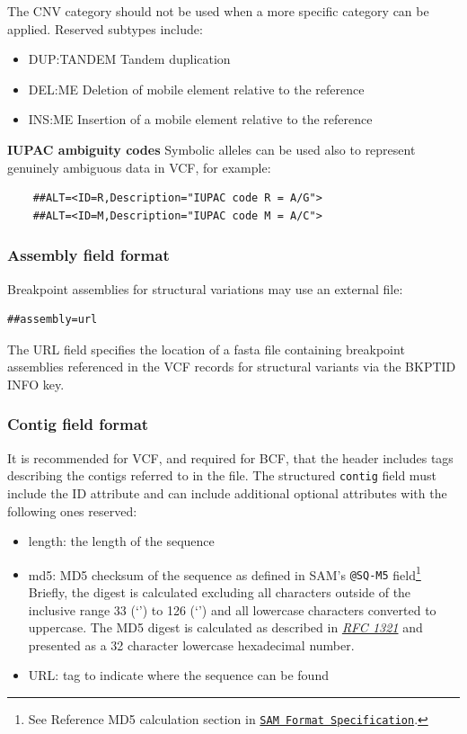 \documentclass[8pt]{article}
\begin{document}
The CNV category should not be used when a more specific category can be applied. Reserved subtypes include:
\begin{itemize}
  \item DUP:TANDEM Tandem duplication
  \item DEL:ME Deletion of mobile element relative to the reference
  \item INS:ME Insertion of a mobile element relative to the reference
\end{itemize}

\bigskip

\noindent \textbf{IUPAC ambiguity codes} \newline
Symbolic alleles can be used also to represent genuinely ambiguous data in VCF, for example:
\begin{verbatim}
    ##ALT=<ID=R,Description="IUPAC code R = A/G">
    ##ALT=<ID=M,Description="IUPAC code M = A/C">
\end{verbatim}


\subsubsection{Assembly field format}
Breakpoint assemblies for structural variations may use an external file:
\begin{verbatim}
##assembly=url
\end{verbatim}

The URL field specifies the location of a fasta file containing breakpoint assemblies referenced in the VCF records for structural variants via the BKPTID INFO key.

\subsubsection{Contig field format}
\label{sec-contig-field}
It is recommended for VCF, and required for BCF, that the header includes tags describing the contigs referred to in the file.
The structured \texttt{contig} field must include the ID attribute and can include additional optional attributes with
the following ones reserved:
\begin{itemize}
  \item length: the length of the sequence
  \item md5: MD5 checksum of the sequence as defined in SAM's {\tt @SQ-M5} field\footnote{See Reference MD5 calculation
      section in \href{https://samtools.github.io/hts-specs/SAMv1.pdf}{\tt SAM Format Specification}.} Briefly, the digest
      is calculated excluding all characters outside of the inclusive range 33 (`') to 126 (`')
      and all lowercase characters converted to uppercase. The MD5 digest is calculated as described in
      \href{https://tools.ietf.org/html/rfc1321}{\sl RFC 1321} and presented as a 32 character lowercase hexadecimal number.
  \item URL: tag to indicate where the sequence can be found
\end{itemize}
\end{document}

